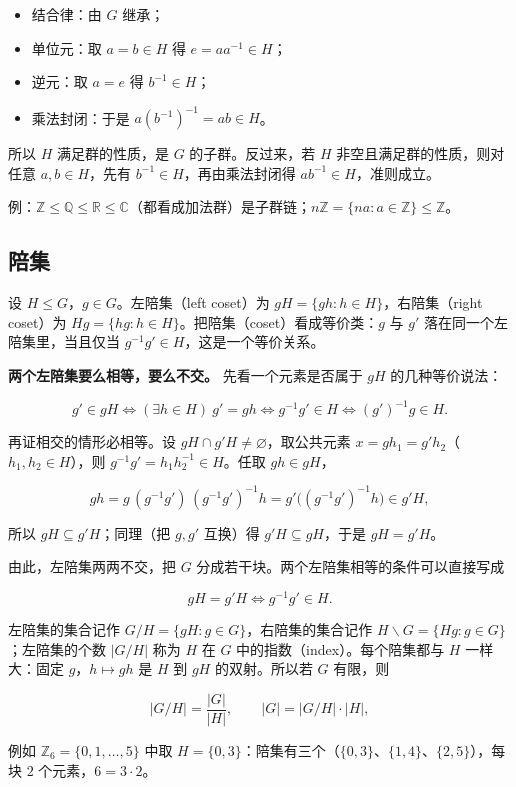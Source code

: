 \begin{itemize}
\item 结合律：由 $G$ 继承；
\item 单位元：取 $a=b\in H$ 得 $e=aa^{-1}\in H$；
\item 逆元：取 $a=e$ 得 $b^{-1}\in H$；
\item 乘法封闭：于是 $a(b^{-1})^{-1}=ab\in H$。
\end{itemize}


所以 $H$ 满足群的性质，是 $G$ 的子群。反过来，若 $H$ 非空且满足群的性质，则对任意 $a,b\in H$，先有 $b^{-1}\in H$，再由乘法封闭得 $ab^{-1}\in H$，准则成立。

例：$\mathbb Z\le\mathbb Q\le\mathbb R\le\mathbb C$（都看成加法群）是子群链；$n\mathbb Z=\{na:a\in\mathbb Z\}\le\mathbb Z$。

\subsection{陪集}


设 $H\le G$，$g\in G$。左陪集（left coset）为 $gH=\{gh:h\in H\}$，右陪集（right coset）为 $Hg=\{hg:h\in H\}$。把陪集（coset）看成等价类：$g$ 与 $g'$ 落在同一个左陪集里，当且仅当 $g^{-1}g'\in H$，这是一个等价关系。

\textbf{两个左陪集要么相等，要么不交。} 先看一个元素是否属于 $gH$ 的几种等价说法：

\[g'\in gH\iff(\exists h\in H)\ g'=gh\iff g^{-1}g'\in H\iff (g')^{-1}g\in H.\]

再证相交的情形必相等。设 $gH\cap g'H\ne\varnothing$，取公共元素 $x=gh_1=g'h_2$（$h_1,h_2\in H$），则 $g^{-1}g'=h_1h_2^{-1}\in H$。任取 $gh\in gH$，

\[gh=g\,(g^{-1}g')\,(g^{-1}g')^{-1}h=g'\bigl((g^{-1}g')^{-1}h\bigr)\in g'H,\]

所以 $gH\subseteq g'H$；同理（把 $g,g'$ 互换）得 $g'H\subseteq gH$，于是 $gH=g'H$。

由此，左陪集两两不交，把 $G$ 分成若干块。两个左陪集相等的条件可以直接写成

\[gH=g'H\iff g^{-1}g'\in H.\]

左陪集的集合记作 $G/H=\{gH:g\in G\}$，右陪集的集合记作 $H\backslash G=\{Hg:g\in G\}$；左陪集的个数 $|G/H|$ 称为 $H$ 在 $G$ 中的指数（index）。每个陪集都与 $H$ 一样大：固定 $g$，$h\mapsto gh$ 是 $H$ 到 $gH$ 的双射。所以若 $G$ 有限，则

\[|G/H|=\frac{|G|}{|H|},\qquad |G|=|G/H|\cdot|H|,\]

例如 $\mathbb Z_6=\{0,1,\ldots,5\}$ 中取 $H=\{0,3\}$：陪集有三个（$\{0,3\}$、$\{1,4\}$、$\{2,5\}$），每块 $2$ 个元素，$6=3\cdot 2$。

